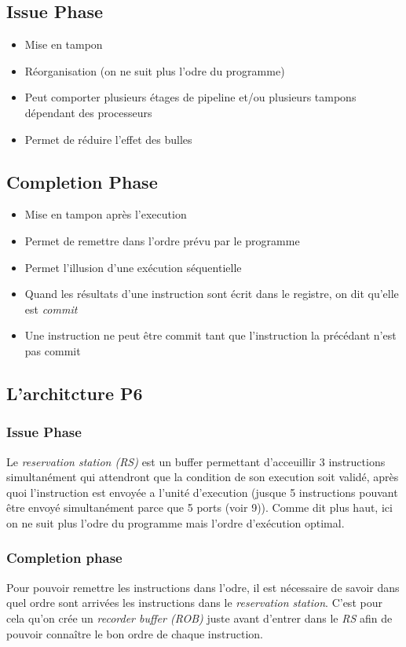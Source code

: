 \documentclass[a4paper]{article}
\begin{document}
  \subsection{Issue Phase}
  \begin{itemize}
    \item Mise en tampon
    \item Réorganisation (on ne suit plus l'odre du programme)
    \item Peut comporter plusieurs étages de pipeline et/ou plusieurs tampons dépendant des processeurs
    \item Permet de réduire l'effet des bulles
  \end{itemize}

  \subsection{Completion Phase}
  \begin{itemize}
    \item Mise en tampon après l'execution
    \item Permet de remettre dans l'ordre prévu par le programme
    \item Permet l'illusion d'une exécution séquentielle
    \item Quand les résultats d'une instruction sont écrit dans le registre, on dit qu'elle est \emph{commit}
    \item Une instruction ne peut être commit tant que l'instruction la précédant n'est pas commit
  \end{itemize}

  \subsection{L'architcture P6}
  \subsubsection{Issue Phase}
  Le \emph{reservation station (RS)} est un buffer permettant d'acceuillir 3 instructions simultanément qui attendront que la condition de son execution soit validé, après quoi
  l'instruction est envoyée a l'unité d'execution (jusque 5 instructions pouvant être envoyé simultanément parce que 5 ports (voir \figurename{9})). 
  Comme dit plus haut, ici on ne suit plus l'odre du programme mais l'ordre 
  d'exécution optimal.
  \subsubsection{Completion phase}
  Pour pouvoir remettre les instructions dans l'odre, il est nécessaire de savoir dans quel ordre sont arrivées les instructions dans le \emph{reservation station}.
  C'est pour cela qu'on crée un \emph{recorder buffer (ROB)} juste avant d'entrer dans le \emph{RS} afin de pouvoir connaître le bon ordre de chaque instruction.
\end{document}
